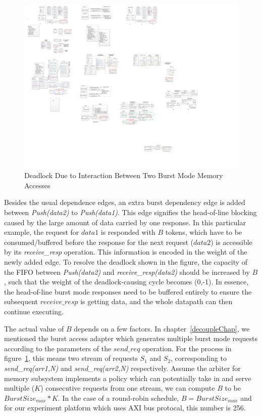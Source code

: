 \begin{figure}[htp]
\begin{center}
\includegraphics[width=1.0\linewidth]{chap4fig/burstDepCoupling.pdf}
\caption{Deadlock Due to Interaction Between Two Burst Mode Memory Accesses
\label{fig:burstDepCop}}
\end{center}
\end{figure}

Besides the usual dependence edges, an extra burst dependency edge is added between \textit{Push(data2)}
to \textit{Push(data1)}. This edge signifies the head-of-line blocking caused by the
large amount of data carried by one response.
In this particular example, the request for $data1$ is responded
with $B$ tokens, which have to be consumed/buffered before the response for the next
request ($data2$) is accessible by its \textit{receive\_resp} operation. This information is encoded
in the weight of the newly added edge.
To resolve the deadlock shown in the figure, the capacity of the FIFO between \textit{Push(data2)} and \textit{receive\_resp(data2)} should be increased by $B$, such
that the weight of the deadlock-causing cycle becomes (0,-1). In essence, the head-of-line 
burst mode responses need to be buffered entirely to ensure the subsequent 
$receive\_resp$ is getting data, and the whole datapath can then continue executing.

The actual value of $B$ depends on a few factors. In chapter~\ref{decoupleChap}, we mentioned the burst access adapter which generates
multiple burst mode requests according to the parameters of the $send\_req$ operation. For the
process in figure~\ref{fig:burstDepCop}, this means two stream of requests $S_1$ and $S_2$, corresponding to \textit{send\_req(arr1,N)} and \textit{send\_req(arr2,N)}  respectively.
Assume the arbiter for memory subsystem implements a policy which can potentially take in and serve multiple ($K$) consecutive requests from one stream, we can compute $B$ to be $BurstSize_{max}*K$. 
In the case of a round-robin schedule, $B = BurstSize_{max}$ and for our experiment platform which uses AXI bus protocal, this number is 256. 

